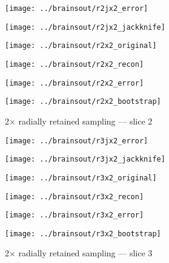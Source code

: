 \documentclass[review,supplement,onefignum,onetabnum,juq]{siamonline181217}
\begin{document}
\begin{figure}
\begin{centering}

\parbox{\imsize}{\texttt{[image: ../brainsout/r2jx2\_error]}}
\parbox{\imsize}{\texttt{[image: ../brainsout/r2jx2\_jackknife]}}

\vspace{\vertsep}

\parbox{\imsize}{\texttt{[image: ../brainsout/r2x2\_original]}}
\parbox{\imsize}{\texttt{[image: ../brainsout/r2x2\_recon]}}

\vspace{\vertsep}

\parbox{\imsize}{\texttt{[image: ../brainsout/r2x2\_error]}}
\parbox{\imsize}{\texttt{[image: ../brainsout/r2x2\_bootstrap]}}

\end{centering}
\caption{2$\times$ radially retained sampling --- slice 2}
\end{figure}


\begin{figure}
\begin{centering}

\parbox{\imsize}{\texttt{[image: ../brainsout/r3jx2\_error]}}
\parbox{\imsize}{\texttt{[image: ../brainsout/r3jx2\_jackknife]}}

\vspace{\vertsep}

\parbox{\imsize}{\texttt{[image: ../brainsout/r3x2\_original]}}
\parbox{\imsize}{\texttt{[image: ../brainsout/r3x2\_recon]}}

\vspace{\vertsep}

\parbox{\imsize}{\texttt{[image: ../brainsout/r3x2\_error]}}
\parbox{\imsize}{\texttt{[image: ../brainsout/r3x2\_bootstrap]}}

\end{centering}
\caption{2$\times$ radially retained sampling --- slice 3}
\end{figure}
\end{document}

